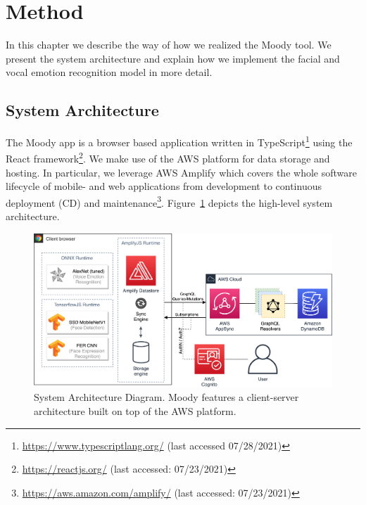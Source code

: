 \section{Method}
\label{sec:method}
In this chapter we describe the way of how we realized the Moody tool. We present the system architecture and explain how we implement the facial and vocal emotion recognition model in more detail.

\subsection{System Architecture}
\label{subsec:method_system_architecture}
The Moody app is a browser based application written in TypeScript\footnote{\url{https://www.typescriptlang.org/} (last accessed 07/28/2021)} using the React framework\footnote{\url{https://reactjs.org/} (last accessed: 07/23/2021)}. We make use of the AWS platform for data storage and hosting. In particular, we leverage AWS Amplify which covers the whole software lifecycle of mobile- and web applications from development to continuous deployment (CD) and maintenance\footnote{\url{https://aws.amazon.com/amplify/} (last accessed: 07/23/2021)}. Figure~\ref{fig:system_architecture} depicts the high-level system architecture.

\begin{figure}
\centering
\includegraphics[width=1\textwidth]{assets/system_architecture.png}
\caption{System Architecture Diagram. Moody features a client-server architecture built on top of the AWS platform.}
\label{fig:system_architecture}
\end{figure}


